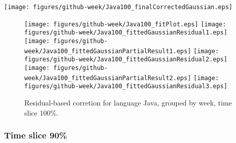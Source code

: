 \begin{center}
{\texttt{[image: figures/github-week/Java100\_finalCorrectedGaussian.eps]}}
\end{center}

\FloatBarrier

\begin{figure}[t]
\centering
{}
{\texttt{[image: figures/github-week/Java100\_fitPlot.eps]}}
{\texttt{[image: figures/github-week/Java100\_fittedGaussianResidual1.eps]}}
{\texttt{[image: figures/github-week/Java100\_fittedGaussianPartialResult1.eps]}}
{\texttt{[image: figures/github-week/Java100\_fittedGaussianResidual2.eps]}}
{\texttt{[image: figures/github-week/Java100\_fittedGaussianPartialResult2.eps]}}
{\texttt{[image: figures/github-week/Java100\_fittedGaussianResidual3.eps]}}
\caption{Residual-based corretion for language Java, grouped by week, time slice 100\%.}
\end{figure}


\FloatBarrier


\subsubsection{Time slice 90\%}

